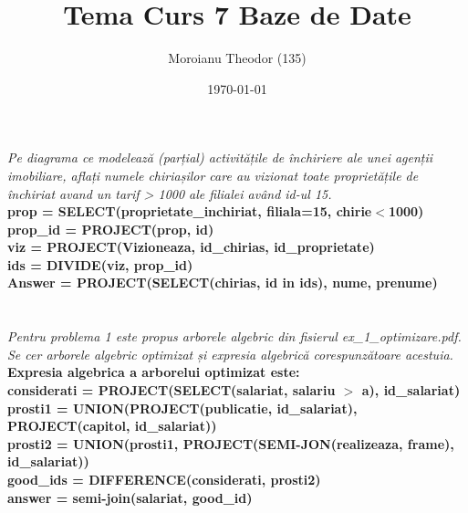 \documentclass[a4paper,12pt]{article}
\begin{document}
	
	\title{Tema Curs 7 Baze de Date}
	\author{Moroianu Theodor (135)}
	\date{\today}
	\maketitle

	\section{}
		\textit{Pe diagrama ce modelează (parțial) activitățile de închiriere ale unei agenții imobiliare, aflați
		numele chiriașilor care au vizionat toate proprietățile de închiriat avand un tarif > 1000 ale
		filialei având id-ul 15. }\\
		\newline
		\textbf{prop = SELECT(proprietate\_inchiriat, filiala=15, chirie$<$1000)\\
		prop\_id = PROJECT(prop, id)\\
		viz = PROJECT(Vizioneaza, id\_chirias, id\_proprietate)\\
		ids = DIVIDE(viz, prop\_id)\\
		Answer = PROJECT(SELECT(chirias, id in ids), nume, prenume)\\
		}
	
	\section{}
		\textit{Pentru problema 1 este propus arborele algebric din fisierul ex\_1\_optimizare.pdf.\\
		Se cer arborele algebric optimizat și expresia algebrică corespunzătoare acestuia.}\\
		\newline
		\textbf{Expresia algebrica a arborelui optimizat este:\\
		considerati = PROJECT(SELECT(salariat, salariu $>$ a), id\_salariat)\\
		prosti1 = UNION(PROJECT(publicatie, id\_salariat), PROJECT(capitol, id\_salariat))\\
		prosti2 = UNION(prosti1, PROJECT(SEMI-JON(realizeaza, frame), id\_salariat))\\		
		good\_ids = DIFFERENCE(considerati, prosti2)\\
		answer = semi-join(salariat, good\_id)}
		
\end{document}
